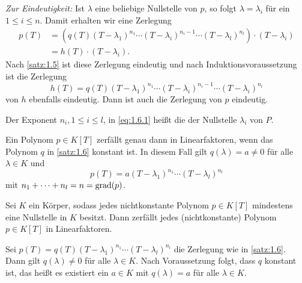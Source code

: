 \begin{beweis}
\begin{description}
		\textit{Zur Eindeutigkeit:}
		Ist $\lambda$ eine beliebige Nullstelle von $p$, so folgt $\lambda = \lambda_i$ für ein $1 \leq i \leq n$.
		Damit erhalten wir eine Zerlegung
		\begin{align*}
			p(T) &= (q(T) (T-\lambda_1)^{n_1} \cdots (T-\lambda_i)^{n_i-1} \cdots (T-\lambda_l)^{n_l})\cdot (T-\lambda_i) \\
			&= h(T) \cdot (T-\lambda_i).
		\end{align*}
		Nach \autoref{satz:1.5} ist diese Zerlegung eindeutig und nach Induktionsvoraussetzung ist die Zerlegung
		\[
			h(T) = q(T) (T-\lambda_1)^{n_1} \cdots (T-\lambda_i)^{n_i-1} \cdots (T-\lambda_i)^{n_l}
		\]
		von $h$ ebenfalls eindeutig.
		Dann ist auch die Zerlegung von $p$ eindeutig. \qedhere
	\end{description}
\end{beweis}

\begin{definition}
	\label{def:1.7}
	Der Exponent $n_i, 1 \leq i \leq l$, in \eqref{eq:1.6.1} heißt die  der Nullstelle $\lambda_i$ von $P$.
\end{definition}

\begin{bemerkung}
	\label{bem:1.8}
	Ein Polynom $p \in K[T]$ zerfällt genau dann in Linearfaktoren, wenn das Polynom $q$ in \autoref{satz:1.6} konstant ist.
	In diesem Fall gilt $q(\lambda) = a \neq 0$ für alle $\lambda \in K$ und
	\[
		p(T) = a(T-\lambda_1)^{n_1} \cdots (T-\lambda_l)^{n_l}
	\]
	mit $n_1+\cdots+n_l = n = \operatorname{grad}(p)$.
\end{bemerkung}

\begin{korollar}
	\label{kor:1.9}
	Sei $K$ ein Körper, sodass jedes nichtkonstante Polynom $p \in K[T]$ mindestens eine Nullstelle in $K$ besitzt.
	Dann zerfällt jedes (nichtkonstante) Polynom $p \in K[T]$ in Linearfaktoren.
\end{korollar}

\begin{beweis}
	Sei $p(T) = q(T)(T-\lambda_1)^{n_1} \cdots (T-\lambda_l)^{n_l}$ die Zerlegung wie in \autoref{satz:1.6}.
	Dann gilt $q(\lambda) \neq 0$ für alle $\lambda \in K$.
	Nach Voraussetzung folgt, dass $q$ konstant ist, das heißt es existiert ein $a \in K$ mit $q(\lambda) = a$ für alle $\lambda \in K$. \qedhere
\end{beweis}


